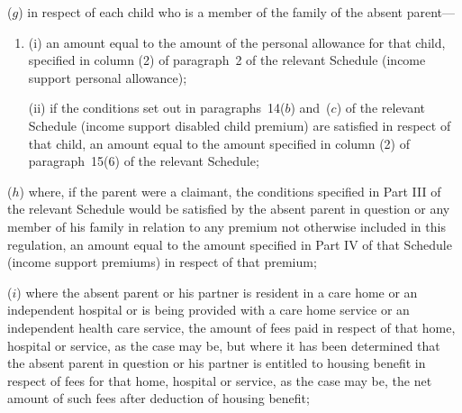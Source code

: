 \documentclass[12pt,a4paper]{article}
\begin{document}
\begin{enumerate}
($g$) in respect of each child who is a member of the family of the absent parent—
\begin{enumerate}\item[]
(i) an amount equal to the amount of the personal allowance for that child, specified in column (2) of paragraph~2 of the relevant Schedule (income support personal allowance);

(ii) if the conditions set out in paragraphs~14($b$) and~($c$) of the relevant Schedule (income support disabled child premium) are satisfied in respect of that child, an amount equal to the amount specified in column (2) of paragraph~15(6) of the relevant Schedule;
\end{enumerate}

($h$) where, if the parent were a claimant, the conditions specified in Part III of the relevant Schedule would be satisfied by the absent parent in question or any member of his family in relation to any premium not otherwise included in this regulation, an amount equal to the amount specified in Part IV of that Schedule (income support premiums) in respect of that premium;

%
%

($i$) where the absent parent or his partner is resident in a care home or an independent hospital or is being provided with a care home service or an independent health care service, the amount of fees paid in respect of that home, hospital or service, as the case may be, but where it has been determined that the absent parent in question or his partner is entitled to housing benefit in respect of fees for that home, hospital or service, as the case may be, the net amount of such fees after deduction of housing benefit;


\end{enumerate}
\end{document}
